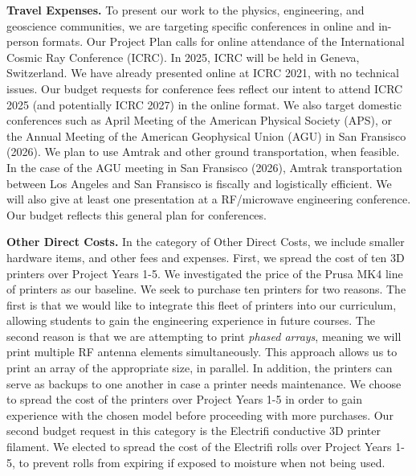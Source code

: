 \documentclass[../../main.tex]{subfiles}
\begin{document}
\textbf{Travel Expenses.}  To present our work to the physics, engineering, and geoscience communities, we are targeting specific conferences in online and in-person formats.  Our Project Plan calls for online attendance of the International Cosmic Ray Conference (ICRC).  In 2025, ICRC will be held in Geneva, Switzerland.  We have already presented online at ICRC 2021, with no technical issues.  Our budget requests for conference fees reflect our intent to attend ICRC 2025 (and potentially ICRC 2027) in the online format.  We also target domestic conferences such as April Meeting of the American Physical Society (APS), or the Annual Meeting of the American Geophysical Union (AGU) in San Fransisco (2026).  We plan to use Amtrak and other ground transportation, when feasible.  In the case of the AGU meeting in San Fransisco (2026), Amtrak transportation between Los Angeles and San Fransisco is fiscally and logistically efficient.  We will also give at least one presentation at a RF/microwave engineering conference.  Our budget reflects this general plan for conferences. \\ \vspace{2.5mm}

\textbf{Other Direct Costs.} In the category of Other Direct Costs, we include smaller hardware items, and other fees and expenses.  First, we spread the cost of ten 3D printers over Project Years 1-5.  We investigated the price of the Prusa MK4 line of printers as our baseline.  We seek to purchase ten printers for two reasons.  The first is that we would like to integrate this fleet of printers into our curriculum, allowing students to gain the engineering experience in future courses.  The second reason is that we are attempting to print \textit{phased arrays}, meaning we will print multiple RF antenna elements simultaneously.  This approach allows us to print an array of the appropriate size, in parallel.  In addition, the printers can serve as backups to one another in case a printer needs maintenance.  We choose to spread the cost of the printers over Project Years 1-5 in order to gain experience with the chosen model before proceeding with more purchases.  Our second budget request in this category is the Electrifi conductive 3D printer filament.  We elected to spread the cost of the Electrifi rolls over Project Years 1-5, to prevent rolls from expiring if exposed to moisture when not being used. \\ \vspace{2.5mm}
\end{document}
